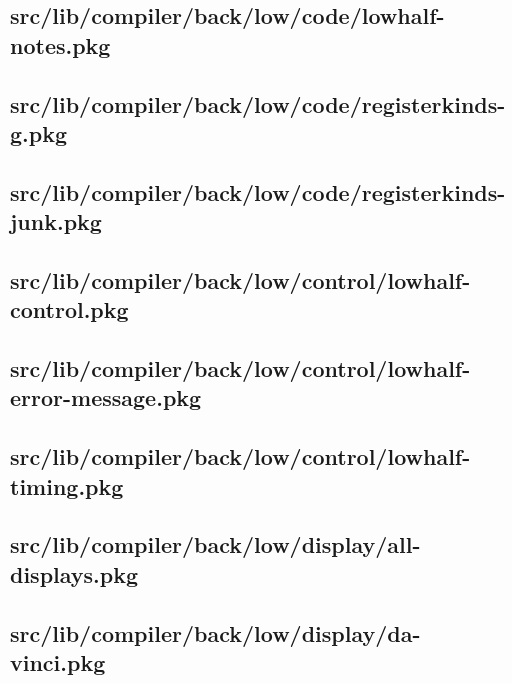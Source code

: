 \subsection{src/lib/compiler/back/low/code/lowhalf-notes.pkg}


\subsection{src/lib/compiler/back/low/code/registerkinds-g.pkg}


\subsection{src/lib/compiler/back/low/code/registerkinds-junk.pkg}


\subsection{src/lib/compiler/back/low/control/lowhalf-control.pkg}


\subsection{src/lib/compiler/back/low/control/lowhalf-error-message.pkg}


\subsection{src/lib/compiler/back/low/control/lowhalf-timing.pkg}


\subsection{src/lib/compiler/back/low/display/all-displays.pkg}


\subsection{src/lib/compiler/back/low/display/da-vinci.pkg}


